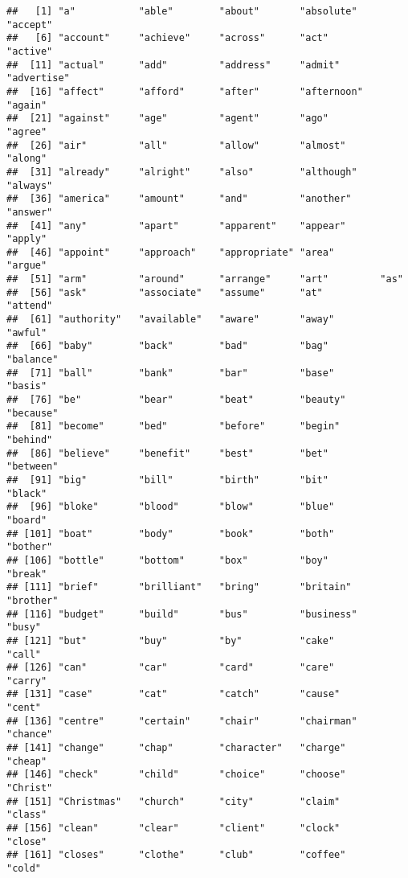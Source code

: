 \documentclass[
]{article}
\begin{document}
\begin{verbatim}
##   [1] "a"           "able"        "about"       "absolute"    "accept"     
##   [6] "account"     "achieve"     "across"      "act"         "active"     
##  [11] "actual"      "add"         "address"     "admit"       "advertise"  
##  [16] "affect"      "afford"      "after"       "afternoon"   "again"      
##  [21] "against"     "age"         "agent"       "ago"         "agree"      
##  [26] "air"         "all"         "allow"       "almost"      "along"      
##  [31] "already"     "alright"     "also"        "although"    "always"     
##  [36] "america"     "amount"      "and"         "another"     "answer"     
##  [41] "any"         "apart"       "apparent"    "appear"      "apply"      
##  [46] "appoint"     "approach"    "appropriate" "area"        "argue"      
##  [51] "arm"         "around"      "arrange"     "art"         "as"         
##  [56] "ask"         "associate"   "assume"      "at"          "attend"     
##  [61] "authority"   "available"   "aware"       "away"        "awful"      
##  [66] "baby"        "back"        "bad"         "bag"         "balance"    
##  [71] "ball"        "bank"        "bar"         "base"        "basis"      
##  [76] "be"          "bear"        "beat"        "beauty"      "because"    
##  [81] "become"      "bed"         "before"      "begin"       "behind"     
##  [86] "believe"     "benefit"     "best"        "bet"         "between"    
##  [91] "big"         "bill"        "birth"       "bit"         "black"      
##  [96] "bloke"       "blood"       "blow"        "blue"        "board"      
## [101] "boat"        "body"        "book"        "both"        "bother"     
## [106] "bottle"      "bottom"      "box"         "boy"         "break"      
## [111] "brief"       "brilliant"   "bring"       "britain"     "brother"    
## [116] "budget"      "build"       "bus"         "business"    "busy"       
## [121] "but"         "buy"         "by"          "cake"        "call"       
## [126] "can"         "car"         "card"        "care"        "carry"      
## [131] "case"        "cat"         "catch"       "cause"       "cent"       
## [136] "centre"      "certain"     "chair"       "chairman"    "chance"     
## [141] "change"      "chap"        "character"   "charge"      "cheap"      
## [146] "check"       "child"       "choice"      "choose"      "Christ"     
## [151] "Christmas"   "church"      "city"        "claim"       "class"      
## [156] "clean"       "clear"       "client"      "clock"       "close"      
## [161] "closes"      "clothe"      "club"        "coffee"      "cold"       

\end{verbatim}
\end{document}
